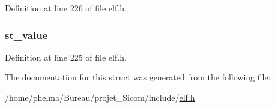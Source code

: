 Definition at line 226 of file elf.\-h.

\hypertarget{struct_elf64___sym_a2d1c1b24798a630f2fa8a2641b7f3292}{
\subsubsection[{st\-\_\-value}]{ st\-\_\-value}}\label{struct_elf64___sym_a2d1c1b24798a630f2fa8a2641b7f3292}


Definition at line 225 of file elf.\-h.



The documentation for this struct was generated from the following file\-:\begin{DoxyCompactItemize}
\item 
/home/phelma/\-Bureau/projet\-\_\-\-Sicom/include/\hyperlink{elf_8h}{elf.\-h}\end{DoxyCompactItemize}
